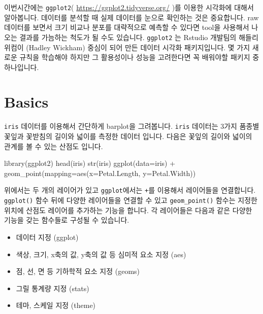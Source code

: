 \documentclass[
]{book}
\newenvironment{Shaded}{\begin{snugshade}}{\end{snugshade}}
\newcommand{\AttributeTok}[1]{\textcolor[rgb]{0.77,0.63,0.00}{#1}}
\newcommand{\FunctionTok}[1]{\textcolor[rgb]{0.00,0.00,0.00}{#1}}
\newcommand{\NormalTok}[1]{#1}
\newcommand{\SpecialCharTok}[1]{\textcolor[rgb]{0.00,0.00,0.00}{#1}}
\providecommand{\tightlist}{%
  \setlength{\itemsep}{0pt}\setlength{\parskip}{0pt}}
\begin{document}
이번시간에는 \texttt{ggplot2}( \url{https://ggplot2.tidyverse.org/} )를 이용한 시각화에 대해서 알아봅니다. 데이터를 분석할 때 실제 데이터를 눈으로 확인하는 것은 중요합니다. raw 데이터를 보면서 크기 비교나 분포를 대략적으로 예측할 수 있다면 tool을 사용해서 나오는 결과를 가늠하는 척도가 될 수도 있습니다. \texttt{ggplot2} 는 Rstudio 개발팀의 해들리위컴이 (Hadley Wickham) 중심이 되어 만든 데이터 시각화 패키지입니다. 몇 가지 새로운 규칙을 학습해야 하지만 그 활용성이나 성능을 고려한다면 꼭 배워야할 패키지 중 하나입니다.

\hypertarget{basics}{%
\section{Basics}\label{basics}}

\texttt{iris} 데이터를 이용해서 간단하게 barplot을 그려봅니다. \texttt{iris} 데이터는 3가지 품종별 꽃잎과 꽃받침의 길이와 넓이를 측정한 데이터 입니다. 다음은 꽃잎의 길이와 넓이의 관계를 볼 수 있는 산점도 입니다.

\begin{Shaded}
\begin{Highlighting}[]
\FunctionTok{library}\NormalTok{(ggplot2)}
\FunctionTok{head}\NormalTok{(iris)}
\FunctionTok{str}\NormalTok{(iris)}
\FunctionTok{ggplot}\NormalTok{(}\AttributeTok{data=}\NormalTok{iris) }\SpecialCharTok{+}
  \FunctionTok{geom\_point}\NormalTok{(}\AttributeTok{mapping=}\FunctionTok{aes}\NormalTok{(}\AttributeTok{x=}\NormalTok{Petal.Length, }\AttributeTok{y=}\NormalTok{Petal.Width))}
\end{Highlighting}
\end{Shaded}

위에서는 두 개의 레이어가 있고 \texttt{ggplot}에서는 \texttt{+}를 이용해서 레이어들을 연결합니다. \texttt{ggplot()} 함수 뒤에 다양한 레이어들을 연결할 수 있고 \texttt{geom\_point()} 함수는 지정한 위치에 산점도 레이어를 추가하는 기능을 합니다. 각 레이어들은 다음과 같은 다양한 기능을 갖는 함수들로 구성될 수 있습니다.

\begin{itemize}
\tightlist
\item
  데이터 지정 (ggplot)
\item
  색상, 크기, x축의 값, y축의 값 등 심미적 요소 지정 (aes)
\item
  점, 선, 면 등 기하학적 요소 지정 (geoms)
\item
  그릴 통계량 지정 (stats)
\item
  테마, 스케일 지정 (theme)
\end{itemize}
\end{document}
